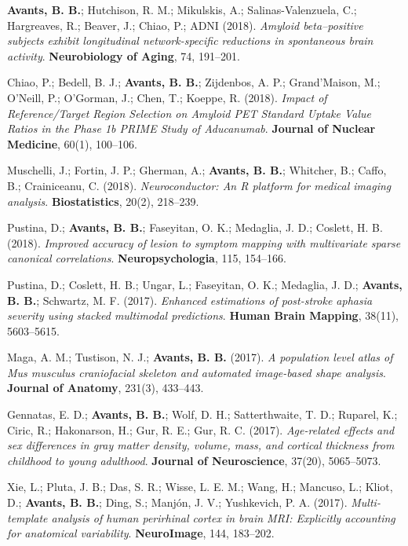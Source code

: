 \documentclass[10pt,letterpaper]{article}
\begin{document}
\begin{enumerate}
{  %
  \item \textbf{Avants, B. B.}; Hutchison, R. M.; Mikulskis, A.; Salinas-Valenzuela, C.; Hargreaves, R.; Beaver, J.; Chiao, P.; ADNI (2018). \textit{Amyloid beta--positive subjects exhibit longitudinal network-specific reductions in spontaneous brain activity}. \textbf{Neurobiology of Aging}, 74, 191--201.
  \item Chiao, P.; Bedell, B. J.; \textbf{Avants, B. B.}; Zijdenbos, A. P.; Grand'Maison, M.; O'Neill, P.; O'Gorman, J.; Chen, T.; Koeppe, R. (2018). \textit{Impact of Reference/Target Region Selection on Amyloid PET Standard Uptake Value Ratios in the Phase 1b PRIME Study of Aducanumab}. \textbf{Journal of Nuclear Medicine}, 60(1), 100--106.
  \item Muschelli, J.; Fortin, J. P.; Gherman, A.; \textbf{Avants, B. B.}; Whitcher, B.; Caffo, B.; Crainiceanu, C. (2018). \textit{Neuroconductor: An R platform for medical imaging analysis}. \textbf{Biostatistics}, 20(2), 218--239.
  \item Pustina, D.; \textbf{Avants, B. B.}; Faseyitan, O. K.; Medaglia, J. D.; Coslett, H. B. (2018). \textit{Improved accuracy of lesion to symptom mapping with multivariate sparse canonical correlations}. \textbf{Neuropsychologia}, 115, 154--166.

  \item Pustina, D.; Coslett, H. B.; Ungar, L.; Faseyitan, O. K.; Medaglia, J. D.; \textbf{Avants, B. B.}; Schwartz, M. F. (2017). \textit{Enhanced estimations of post-stroke aphasia severity using stacked multimodal predictions}. \textbf{Human Brain Mapping}, 38(11), 5603--5615.
  \item Maga, A. M.; Tustison, N. J.; \textbf{Avants, B. B.} (2017). \textit{A population level atlas of Mus musculus craniofacial skeleton and automated image-based shape analysis}. \textbf{Journal of Anatomy}, 231(3), 433--443.
  \item Gennatas, E. D.; \textbf{Avants, B. B.}; Wolf, D. H.; Satterthwaite, T. D.; Ruparel, K.; Ciric, R.; Hakonarson, H.; Gur, R. E.; Gur, R. C. (2017). \textit{Age-related effects and sex differences in gray matter density, volume, mass, and cortical thickness from childhood to young adulthood}. \textbf{Journal of Neuroscience}, 37(20), 5065--5073.
  \item Xie, L.; Pluta, J. B.; Das, S. R.; Wisse, L. E. M.; Wang, H.; Mancuso, L.; Kliot, D.; \textbf{Avants, B. B.}; Ding, S.; Manj{\'o}n, J. V.; Yushkevich, P. A. (2017). \textit{Multi-template analysis of human perirhinal cortex in brain MRI: Explicitly accounting for anatomical variability}. \textbf{NeuroImage}, 144, 183--202.

}
\end{enumerate}
\end{document}
